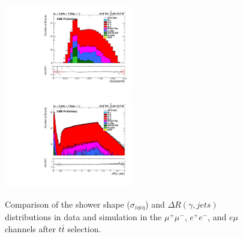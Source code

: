 \documentclass[oneside, a4paper, 11pt, ]{report}
\begin{document}
\begin{figure}
\includegraphics[width=0.5\textwidth]{Plots/ControlPlots/TTbarDiLeptonAnalysis/EMu/Photons/AllPhotons/Log/Photon_sigma_ietaieta_barrel_splitTTbar_ratio.pdf}
\includegraphics[width=0.5\textwidth]{Plots/ControlPlots/TTbarDiLeptonAnalysis/EMu/Photons/AllPhotons/Log/Photon_deltaR_jets_splitTTbar_ratio.pdf}
\caption{Comparison of the shower shape ($\sigma_{i\eta i\eta}$) and $\Delta R(\gamma, jets)$ distributions in data and simulation in the $\mu^{+}\mu^{-}$, $e^{+}e^{-}$, and $e\mu$ channels after $t\bar{t}$ selection.}
\label{fig-ttbarShowerShapeAndDRjets}
\end{figure}
\end{document}

